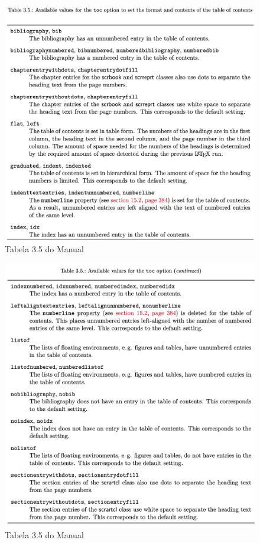 \begin{figure}
    \centering
    \includegraphics[width=1\linewidth]{tab3_5.png}
    \caption{Tabela 3.5 do Manual}
    \label{fig:tab3_5}
\end{figure}

\begin{figure}
    \centering
    \includegraphics[width=1\linewidth]{tab3_5b.png}
    \caption{Tabela 3.5 do Manual}
    \label{fig:tab3_5b}
\end{figure}

